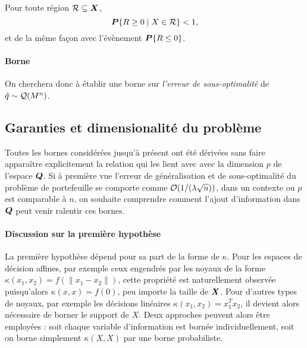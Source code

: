 \begin{assumption}
  \label{hyp:arb}
  Pour toute région $\mathcal{R}\subseteq\bm{X}$,
  \begin{equation}
    \bm P\{R \geq 0 \mid X \in \mathcal{R}\} < 1,
  \end{equation}
  et de la même façon avec l'évènement $\bm P\{R \leq 0\}$. 
\end{assumption}

\paragraph{Borne}

On cherchera donc à établir une borne sur \textit{l'erreur de sous-optimalité} de
$\hat q \sim \mathcal{Q}(M^n)$.


\subsection{Garanties et dimensionalité du problème}
\label{b:dim}

Toutes les bornes considérées jusqu'à présent ont été dérivées sans faire apparaître
explicitement la relation qui les lient avec avec la dimension $p$ de l'espace $\bm Q$. Si à
première vue l'erreur de généralisation et de sous-optimalité du problème de portefeuille
se comporte comme $\mathcal{O}(1/(\lambda \sqrt{n}))$, dans un contexte ou $p$ est comparable à $n$, on
souhaite comprendre comment l'ajout d'information dans $\bm Q$ peut venir ralentir ces
bornes.



\paragraph{Discussion sur la première hypothèse}


La première hypothèse dépend pour sa part de la forme de $\kappa$. Pour les
espaces de décision affines, par exemple ceux engendrés par les noyaux de la forme
$\kappa(x_1,x_2) = f(\|x_1-x_2\|)$, cette propriété est naturellement observée puisqu'alors
$\kappa(x,x) = f(0)$, peu importe la taille de $\bm{X}$. Pour d'autres types de noyaux, par exemple
les décisions linéaires $\kappa(x_1,x_2) = x_1^Tx_2$, il devient alors nécessaire de borner le
support de $X$. Deux approches peuvent alors être employées : soit chaque variable
d'information est bornée individuellement, soit on borne simplement $\kappa(X,X)$ par une borne
probabiliste. 


